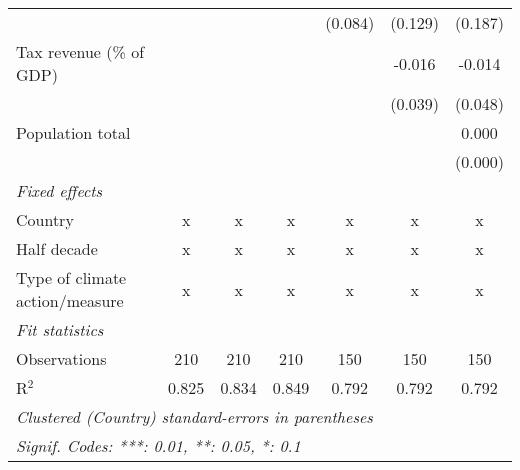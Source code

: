 \begin{tabular}{lcccccc}
                                                  &               &                &                & (0.084)        & (0.129)        & (0.187)\\   
   Tax revenue (\% of GDP)                        &               &                &                &                & -0.016         & -0.014\\   
                                                  &               &                &                &                & (0.039)        & (0.048)\\   
   Population total                               &               &                &                &                &                & 0.000\\   
                                                  &               &                &                &                &                & (0.000)\\   
   \emph{Fixed effects}\\
   Country                                        & x             & x              & x              & x              & x              & x\\  
   Half decade                                    & x             & x              & x              & x              & x              & x\\  
   Type of climate action/measure                 & x             & x              & x              & x              & x              & x\\  
   \midrule \emph{Fit statistics}\\
   Observations                                   & 210           & 210            & 210            & 150            & 150            & 150\\  
   R$^2$                                          & 0.825         & 0.834          & 0.849          & 0.792          & 0.792          & 0.792\\  
   \midrule
   \multicolumn{7}{l}{\emph{Clustered (Country) standard-errors in parentheses}}\\
   \multicolumn{7}{l}{\emph{Signif. Codes: ***: 0.01, **: 0.05, *: 0.1}}\\
\end{tabular}
\par\endgroup


